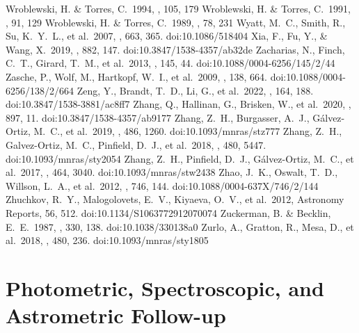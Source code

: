 \documentclass[twocolumn,tighten,twocolappendix]{aastex631}
\begin{document}
\begin{thebibliography}{}
 Wroblewski, H. \& Torres, C.\ 1994, \aaps, 105, 179
 Wroblewski, H. \& Torres, C.\ 1991, \aaps, 91, 129
 Wroblewski, H. \& Torres, C.\ 1989, \aaps, 78, 231
 Wyatt, M.~C., Smith, R., Su, K.~Y.~L., et al.\ 2007, \apj, 663, 365. doi:10.1086/518404
 Xia, F., Fu, Y., \& Wang, X.\ 2019, \apj, 882, 147. doi:10.3847/1538-4357/ab32de
 Zacharias, N., Finch, C.~T., Girard, T.~M., et al.\ 2013, \aj, 145, 44. doi:10.1088/0004-6256/145/2/44
 Zasche, P., Wolf, M., Hartkopf, W.~I., et al.\ 2009, \aj, 138, 664. doi:10.1088/0004-6256/138/2/664
 Zeng, Y., Brandt, T.~D., Li, G., et al.\ 2022, \aj, 164, 188. doi:10.3847/1538-3881/ac8ff7
 Zhang, Q., Hallinan, G., Brisken, W., et al.\ 2020, \apj, 897, 11. doi:10.3847/1538-4357/ab9177
 Zhang, Z.~H., Burgasser, A.~J., G{\'a}lvez-Ortiz, M.~C., et al.\ 2019, \mnras, 486, 1260. doi:10.1093/mnras/stz777
 Zhang, Z.~H., Galvez-Ortiz, M.~C., Pinfield, D.~J., et al.\ 2018, \mnras, 480, 5447. doi:10.1093/mnras/sty2054
 Zhang, Z.~H., Pinfield, D.~J., G{\'a}lvez-Ortiz, M.~C., et al.\ 2017, \mnras, 464, 3040. doi:10.1093/mnras/stw2438
 Zhao, J.~K., Oswalt, T.~D., Willson, L.~A., et al.\ 2012, \apj, 746, 144. doi:10.1088/0004-637X/746/2/144
 Zhuchkov, R.~Y., Malogolovets, E.~V., Kiyaeva, O.~V., et al.\ 2012, Astronomy Reports, 56, 512. doi:10.1134/S1063772912070074
 Zuckerman, B. \& Becklin, E.~E.\ 1987, \nat, 330, 138. doi:10.1038/330138a0
 Zurlo, A., Gratton, R., Mesa, D., et al.\ 2018, \mnras, 480, 236. doi:10.1093/mnras/sty1805
\end{thebibliography}


\appendix
\restartappendixnumbering

\section{Photometric, Spectroscopic, and Astrometric Follow-up\label{sec:appendix_phot_spec_astrom}}
\end{document}
